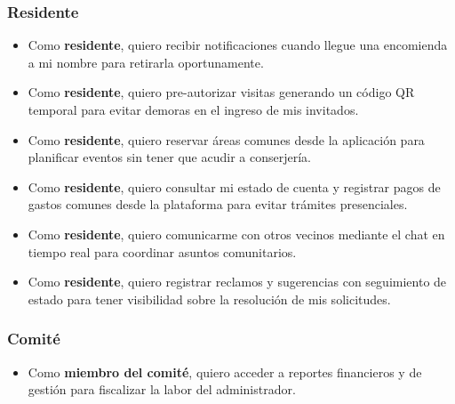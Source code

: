 \subsubsection*{Residente}
\begin{itemize}
  \item Como \textbf{residente}, quiero recibir notificaciones cuando llegue una encomienda a mi nombre para retirarla oportunamente.
  \item Como \textbf{residente}, quiero pre-autorizar visitas generando un código QR temporal para evitar demoras en el ingreso de mis invitados.
  \item Como \textbf{residente}, quiero reservar áreas comunes desde la aplicación para planificar eventos sin tener que acudir a conserjería.
  \item Como \textbf{residente}, quiero consultar mi estado de cuenta y registrar pagos de gastos comunes desde la plataforma para evitar trámites presenciales.
  \item Como \textbf{residente}, quiero comunicarme con otros vecinos mediante el chat en tiempo real para coordinar asuntos comunitarios.
  \item Como \textbf{residente}, quiero registrar reclamos y sugerencias con seguimiento de estado para tener visibilidad sobre la resolución de mis solicitudes.
\end{itemize}

\subsubsection*{Comité}
\begin{itemize}
  \item Como \textbf{miembro del comité}, quiero acceder a reportes financieros y de gestión para fiscalizar la labor del administrador.
\end{itemize}

